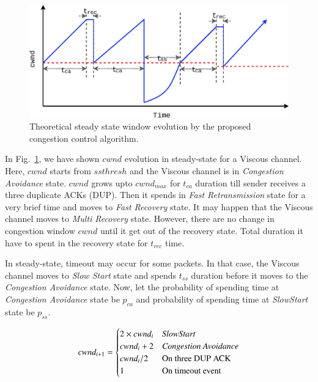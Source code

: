 \begin{figure}[!h]
	\centering
	\includegraphics[width=\linewidth]{img/model/window_evolution}
	\caption{Theoretical steady state window evolution by the proposed congestion control algorithm.}
	\label{fig:cwnd-evo}
\end{figure}

In Fig.~\ref{fig:cwnd-evo}, we have shown $cwnd$ evolution in steady-state for a Viscous channel. Here, $cwnd$ starts from $ssthresh$ and the Viscous channel is in {\it Congestion Avoidance} state. $cwnd$ grows upto $cwnd_{max}$ for $t_{ca}$ duration till sender receives a three duplicate ACKs (DUP). Then it spends in {\it Fast Retransmission} state for a very brief time and moves to {\it Fast Recovery} state. It may happen that the Viscous channel moves to {\it Multi Recovery} state. However, there are no change in congestion window $cwnd$ until it get out of the recovery state. Total duration it have to spent in the recovery state for $t_{rec}$ time.

In steady-state, timeout may occur for some packets. In that case, the Viscous channel moves to {\it Slow Start} state and spends $t_{ss}$ duration before it moves to the {\it Congestion Avoidance} state. Now, let the probability of spending time at {\it Congestion Avoidance} state be $p_{ca}$ and probability of spending time at {\it SlowStart} state be $p_{ss}$.

\begin{equation} \label{eqn:cwnd_update}
cwnd_{i+1} = 	
\begin{cases}
 2 \times cwnd_{i} & \text{\it SlowStart} \\
 cwnd_{i} + 2 & \text{\it Congestion Avoidance} \\
 cwnd_{i} / 2 & \text{On three DUP ACK} \\
 1 & \text{On timeout event} 
\end{cases}
\end{equation}

